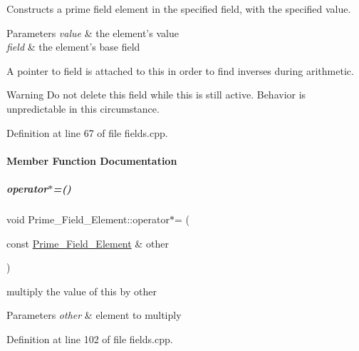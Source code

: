 Constructs a prime field element in the specified field, with the specified value. 


\begin{DoxyParams}{Parameters}
{\em value} & the element's value \\
\hline
{\em field} & the element's base field\\
\hline
\end{DoxyParams}
A pointer to {\ttfamily field} is attached to {\ttfamily this} in order to find inverses during arithmetic. \begin{DoxyWarning}{Warning}
Do not delete this field while {\ttfamily this} is still active. Behavior is unpredictable in this circumstance. 
\end{DoxyWarning}


Definition at line 67 of file fields.\+cpp.



\paragraph{Member Function Documentation}
\mbox{\label{group___fields_group_a1ef7c74bd84a82b7c346dd7fa4e4a480}} 
\subparagraph{\texorpdfstring{operator$\ast$=()}{operator*=()}\hspace{0.1cm}{\footnotesize\ttfamily [1/2]}}
{\footnotesize\ttfamily void Prime\+\_\+\+Field\+\_\+\+Element\+::operator$\ast$= (\begin{DoxyParamCaption}\item[{const \hyperlink{group___fields_group_class_prime___field___element}{Prime\+\_\+\+Field\+\_\+\+Element} \&}]{other }\end{DoxyParamCaption})}



multiply the value of {\ttfamily this} by {\ttfamily other} 


\begin{DoxyParams}{Parameters}
{\em other} & element to multiply \\
\hline
\end{DoxyParams}


Definition at line 102 of file fields.\+cpp.

